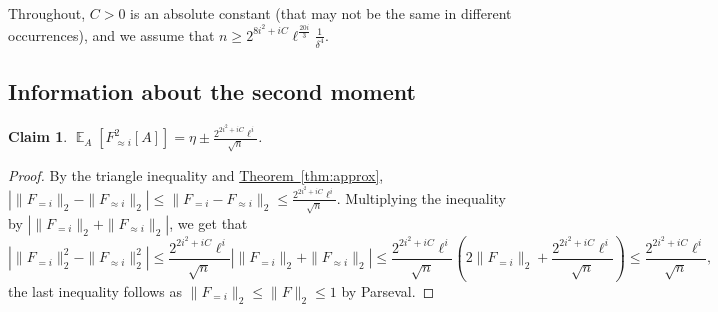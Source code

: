 \documentclass[11pt]{article}
\newcommand{\expref}[2]{\texorpdfstring{\hyperref[#2]{#1~\ref{#2}}}{#1~\ref{#2}}}
\newtheorem{claim}[theorem]{Claim}
\newcommand\card[1]{\left| {#1} \right|}
\newcommand\Expect[2]{{\mathop{\mathbb{E}}_{#1}\left[ {#2} \right]}}
\newcommand\norm[1]{\| #1 \|}
\renewcommand\geq{\geqslant}
\renewcommand\leq{\leqslant}
\newcommand\lvlfn[2]{{#1}_{={#2}}}
\newcommand\approxlvlfn[2]{{#1}_{\approx{#2}}}
\begin{document}
Throughout, $C>0$ is an absolute constant (that may not be the same in different occurrences), %
and we assume that
$n\geq 2^{8i^2+iC}\ell^{\frac{20i}{3}}\frac{1}{\delta^4}$.

\subsection{Information about the second moment}
\begin{claim}
$\Expect{A}{\approxlvlfn{F}{i}^2[A]} = \eta \pm \frac{2^{2i^2+iC} \ell^{i}}{\sqrt{n}}$.
\end{claim}
\begin{proof}
By the triangle inequality and \expref{Theorem}{thm:approx},
$\card{\norm{
\lvlfn{F}{i}}_2
-\norm{\approxlvlfn{F}{i}}_2}
\leq
\norm{\lvlfn{F}{i}-\approxlvlfn{F}{i}}_2
\leq \frac{2^{2i^2+iC} \ell^{i}}{\sqrt{n}}$.
Multiplying the inequality by
$\card{\norm{\lvlfn{F}{i}}_2+\norm{\approxlvlfn{F}{i}}_2}$, we get that
\[
\card{\norm{
\lvlfn{F}{i}}_2^2
-\norm{\approxlvlfn{F}{i}}_2^2}
\leq \frac{2^{2i^2+iC} \ell^{i}}{\sqrt{n}}
\card{\norm{\lvlfn{F}{i}}_2+\norm{\approxlvlfn{F}{i}}_2}
\leq \frac{2^{2i^2+iC} \ell^{i}}{\sqrt{n}}
\left(2\norm{\lvlfn{F}{i}}_2+\frac{2^{2i^2+iC} \ell^{i}}{\sqrt{n}}\right)
\leq \frac{2^{2i^2+iC} \ell^{i}}{\sqrt{n}},
\]
the last inequality follows as $\norm{\lvlfn{F}{i}}_2\leq \norm{F}_2 \leq 1$ by Parseval.
\end{proof}
\end{document}
